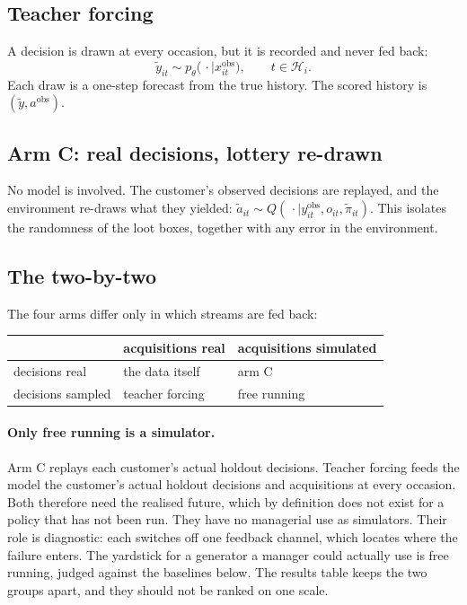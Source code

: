 \documentclass[11pt]{article}
\begin{document}
\subsection{Teacher forcing}

A decision is drawn at every occasion, but it is recorded and never fed back:
\begin{equation}
\tilde y_{it} \sim p_\theta\big(\,\cdot \mid x_{it}^{\text{obs}}\big),
\qquad t \in \mathcal{H}_i .
\end{equation}
Each draw is a one-step forecast from the true history. The scored history is
$(\tilde y, a^{\text{obs}})$.

\subsection{Arm C: real decisions, lottery re-drawn}

No model is involved. The customer's observed decisions are replayed, and the
environment re-draws what they yielded:
$\tilde a_{it} \sim Q(\,\cdot \mid y_{it}^{\text{obs}}, o_{it}, \tilde\pi_{it})$.
This isolates the randomness of the loot boxes, together with any error in the
environment.

\subsection{The two-by-two}

The four arms differ only in which streams are fed back:

\begin{center}
\small
\begin{tabular}{lll}
\toprule
 & acquisitions real & acquisitions simulated \\
\midrule
decisions real    & the data itself & arm C \\
decisions sampled & teacher forcing & free running \\
\bottomrule
\end{tabular}
\end{center}

\paragraph{Only free running is a simulator.} Arm C replays each customer's
actual holdout decisions. Teacher forcing feeds the model the customer's actual
holdout decisions and acquisitions at every occasion. Both therefore need the
realised future, which by definition does not exist for a policy that has not
been run. They have no managerial use as simulators. Their role is diagnostic:
each switches off one feedback channel, which locates where the failure enters.
The yardstick for a generator a manager could actually use is free running,
judged against the baselines below. The results table keeps the two groups
apart, and they should not be ranked on one scale.
\end{document}
